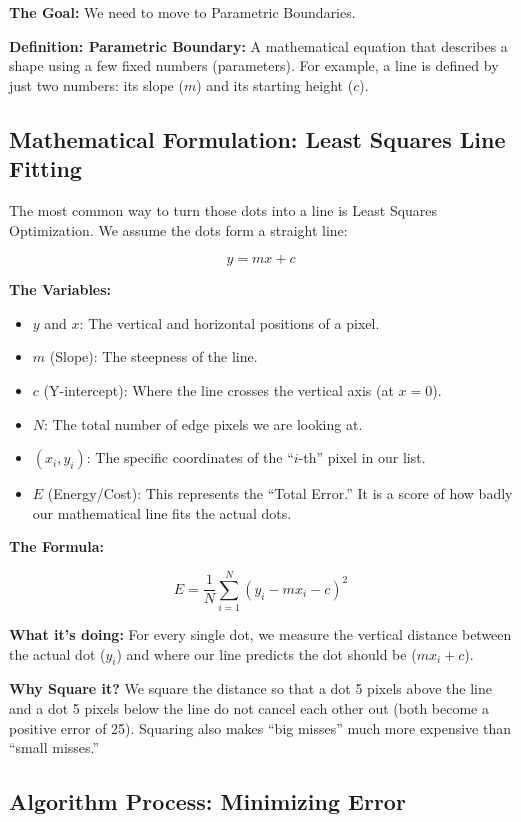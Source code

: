 \documentclass[12pt]{article}
\begin{document}
\textbf{The Goal:}
We need to move to Parametric Boundaries.

\textbf{Definition: Parametric Boundary:}
A mathematical equation that describes a shape using a few fixed numbers (parameters). For example, a line is defined by just two numbers: its slope ($m$) and its starting height ($c$).

\subsection{Mathematical Formulation: Least Squares Line Fitting}

The most common way to turn those dots into a line is Least Squares Optimization. We assume the dots form a straight line:

\[
    y = mx + c
\]

\textbf{The Variables:}
\begin{itemize}
    \item $y$ and $x$: The vertical and horizontal positions of a pixel.
    \item $m$ (Slope): The steepness of the line.
    \item $c$ (Y-intercept): Where the line crosses the vertical axis (at $x=0$).
    \item $N$: The total number of edge pixels we are looking at.
    \item $(x_i, y_i)$: The specific coordinates of the ``$i$-th'' pixel in our list.
    \item $E$ (Energy/Cost): This represents the ``Total Error.'' It is a score of how badly our mathematical line fits the actual dots.
\end{itemize}

\textbf{The Formula:}

\[
    E = \frac{1}{N} \sum_{i=1}^{N} (y_i - mx_i - c)^2
\]

\textbf{What it's doing:}
For every single dot, we measure the vertical distance between the actual dot ($y_i$) and where our line predicts the dot should be ($mx_i + c$).

\textbf{Why Square it?}
We square the distance so that a dot 5 pixels above the line and a dot 5 pixels below the line do not cancel each other out (both become a positive error of 25). Squaring also makes ``big misses'' much more expensive than ``small misses.''


\subsection{Algorithm Process: Minimizing Error}
\end{document}
